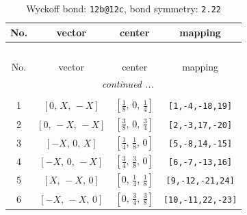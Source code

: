 \documentclass[fleqn,8pt]{jsarticle}
\begin{document}
\renewcommand{\arraystretch}{1.2}
\begin{longtable}{cccc}
\caption{Wyckoff bond: {\tt 12b@12c}, bond symmetry: {\tt 2.22}}
 \\
 \hline \hline
No. & vector & center & mapping \\ \hline \endfirsthead

\multicolumn{3}{l}{\tablename\ \thetable{}} \\
 \hline \hline
No. & vector & center & mapping \\ \hline \endhead

 \hline \hline
\multicolumn{3}{r}{\footnotesize\it continued ...} \\ \endfoot

 \hline \hline
\multicolumn{3}{r}{} \\ \endlastfoot

1 & $\left[ 0,\, X,\, - X \right]$ & $\left[ \frac{1}{8},\, 0,\, \frac{1}{4} \right]$ & {\tt [1,-4,-18,19]} \\ \hline
2 & $\left[ 0,\, - X,\, - X \right]$ & $\left[ \frac{3}{8},\, 0,\, \frac{3}{4} \right]$ & {\tt [2,-3,17,-20]} \\ \hline
3 & $\left[ - X,\, 0,\, X \right]$ & $\left[ \frac{1}{4},\, \frac{1}{8},\, 0 \right]$ & {\tt [5,-8,14,-15]} \\ \hline
4 & $\left[ - X,\, 0,\, - X \right]$ & $\left[ \frac{3}{4},\, \frac{3}{8},\, 0 \right]$ & {\tt [6,-7,-13,16]} \\ \hline
5 & $\left[ X,\, - X,\, 0 \right]$ & $\left[ 0,\, \frac{1}{4},\, \frac{1}{8} \right]$ & {\tt [9,-12,-21,24]} \\ \hline
6 & $\left[ - X,\, - X,\, 0 \right]$ & $\left[ 0,\, \frac{3}{4},\, \frac{3}{8} \right]$ & {\tt [10,-11,22,-23]} \\
\end{longtable}
\renewcommand{\arraystretch}{1.2}
\end{document}
